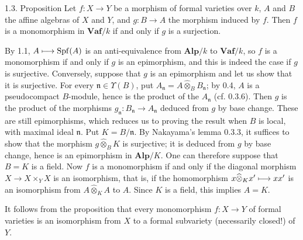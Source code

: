 \begin{enonce}{1.3. Proposition}{}\label{VIIB.1.3}
Let $f:X\to Y$ be a morphism of formal varieties over $k$, $A$ and $B$ the affine algebras of $X$ and $Y$, and $g:B\to A$ the morphism induced by $f$. Then $f$ is a monomorphism in $\mathbf{Vaf}/k$ if and only if $g$ is a surjection.
\end{enonce}
By 1.1, $A\longmapsto\operatorname{Spf}(A)$ is an anti-equivalence from $\mathbf{Alp}/k$ to $\mathbf{Vaf}/k$, so $f$ is a monomorphism if and only if $g$ is an epimorphism, and this is indeed the case if $g$ is surjective.
Conversely, suppose that $g$ is an epimorphism and let us show that it is surjective. For every $\mathfrak n\in\Upsilon(B)$, put $A_{\mathfrak n}=A\widehat\otimes_B B_{\mathfrak n}$; by 0.4, $A$ is a pseudocompact $B$-module, hence is the product of the $A_{\mathfrak n}$ (cf. 0.3.6). Then $g$ is the product of the morphisms $g_{\mathfrak n}:B_{\mathfrak n}\to A_{\mathfrak n}$ deduced from $g$ by base change. These are still epimorphisms, which reduces us to proving the result when $B$ is local, with maximal ideal $\mathfrak n$. Put $K=B/\mathfrak n$.
By Nakayama's lemma 0.3.3, it suffices to show that the morphism $g\widehat\otimes_B K$ is surjective; it is deduced from $g$ by base change, hence is an epimorphism in $\mathbf{Alp}/K$. One can therefore suppose that $B=K$ is a field. Now $f$ is a monomorphism if and only if the diagonal morphism $X\to X\times_Y X$ is an isomorphism, that is, if the homomorphism $x\widehat\otimes_K x'\longmapsto xx'$ is an isomorphism from $A\widehat\otimes_K A$ to $A$. Since $K$ is a field, this implies $A=K$.
\begin{remark}{}
It follows from the proposition that every monomorphism $f:X\to Y$ of formal varieties is an isomorphism from $X$ to a formal subvariety (necessarily closed!) of $Y$.
\end{remark}

